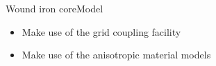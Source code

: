 %
%
%
%
%

\begin{frame}{Wound iron core}{Model}
  \begin{itemize}
  \item Make use of the grid coupling facility
  \item Make use of the anisotropic material models
  \end{itemize}
  \vfil
  \begin{minipage}{\linewidth}
    \hfil
    \hfil
    \hfil
  \end{minipage}
\end{frame}

